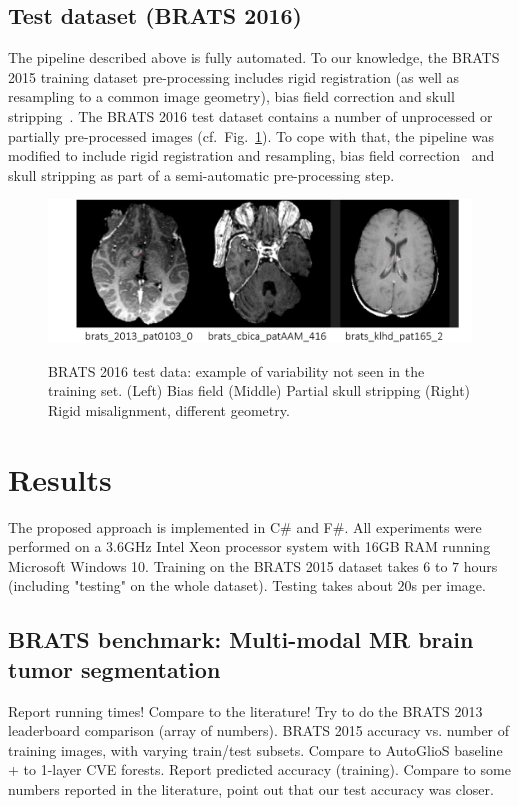\subsection{Test dataset (BRATS 2016)}

The pipeline described above is fully automated. To our knowledge, the BRATS 2015 training dataset pre-processing includes rigid registration (as well as resampling to a common image geometry), bias field correction and skull stripping~\cite{menze2015multimodal}. The BRATS 2016 test dataset contains a number of unprocessed or partially pre-processed images (cf.~Fig.~\ref{fig: test data}). To cope with that, the pipeline was modified to include rigid registration and resampling, bias field correction~\cite{tustison2009n4itk} and skull stripping as part of a semi-automatic pre-processing step.

\begin{figure}
\centering
\includegraphics[width=1\textwidth]{images/BRATS2016_example-data.png}
\label{fig: test data}
\caption{BRATS 2016 test data: example of variability not seen in the training set. (Left) Bias field (Middle) Partial skull stripping (Right) Rigid misalignment, different geometry.}
\end{figure}

\section{Results}
\label{sec: results}

The proposed approach is implemented in C\# and F\#. All experiments were performed on a 3.6GHz Intel Xeon processor system with 16GB RAM running Microsoft Windows 10. Training on the BRATS 2015 dataset takes $6$ to $7$ hours (including "testing" on the whole dataset). Testing takes about $20$s per image.

\subsection{BRATS benchmark: Multi-modal MR brain tumor segmentation}

Report running times! Compare to the literature! Try to do the BRATS 2013 leaderboard comparison (array of numbers). BRATS 2015 accuracy vs. number of training images, with varying train/test subsets. Compare to AutoGlioS baseline + to 1-layer CVE forests. Report predicted accuracy (training). Compare to some numbers reported in the literature, point out that our test accuracy was closer.
